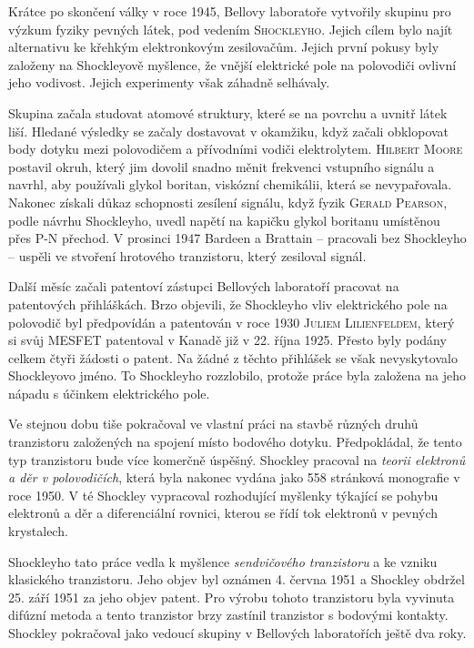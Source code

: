     \begin{mdframed}[style=mdnote]
      
      Krátce po skončení války v roce 1945, Bellovy laboratoře vytvořily skupinu pro výzkum fyziky
      pevných látek, pod vedením \textsc{Shockleyho}. Jejich cílem bylo najít alternativu ke křehkým
      elektronkovým zesilovačům. Jejich první pokusy byly založeny na Shockleyově myšlence, že
      vnější elektrické pole na polovodiči ovlivní jeho vodivost. Jejich experimenty však záhadně
      selhávaly.

      Skupina začala studovat atomové struktury, které se na povrchu a uvnitř látek liší. Hledané
      výsledky se začaly dostavovat v okamžiku, když začali obklopovat body dotyku mezi polovodičem
      a přívodními vodiči elektrolytem. \textsc{Hilbert Moore} postavil okruh, který jim dovolil
      snadno měnit frekvenci vstupního signálu a navrhl, aby používali glykol boritan, viskózní
      chemikálii, která se nevypařovala. Nakonec získali důkaz schopnosti zesílení signálu, když
      fyzik \textsc{Gerald Pearson}, podle návrhu Shockleyho, uvedl napětí na kapičku glykol
      boritanu umístěnou přes \textsc{P-N} přechod. V prosinci 1947 Bardeen a Brattain – pracovali
      bez Shockleyho – uspěli ve stvoření hrotového tranzistoru, který zesiloval signál.

      Další měsíc začali patentoví zástupci Bellových laboratoří pracovat na patentových
      přihláškách. Brzo objevili, že Shockleyho vliv elektrického pole na polovodič byl předpovídán
      a patentován v roce 1930 \textsc{Juliem Lilienfeldem}, který si svůj \textsc{MESFET}
      patentoval v Kanadě již v 22. října 1925. Přesto byly podány celkem čtyři žádosti o patent. Na
      žádné z těchto přihlášek se však nevyskytovalo Shockleyovo jméno. To Shockleyho rozzlobilo,
      protože práce byla založena na jeho nápadu s účinkem elektrického pole. 
      
      Ve stejnou dobu tiše pokračoval ve vlastní práci na stavbě různých druhů tranzistoru
      založených na spojení místo bodového dotyku. Předpokládal, že tento typ tranzistoru bude více
      komerčně úspěšný. Shockley pracoval na \emph{teorii elektronů a děr v polovodičích}, která
      byla nakonec vydána jako 558 stránková monografie v roce 1950. V té Shockley vypracoval
      rozhodující myšlenky týkající se pohybu elektronů a děr a diferenciální rovnici, kterou se
      řídí tok elektronů v pevných krystalech.

      Shockleyho tato práce vedla k myšlence \emph{sendvičového tranzistoru} a ke vzniku klasického
      tranzistoru. Jeho objev byl oznámen 4. června 1951 a Shockley obdržel 25. září 1951 za jeho
      objev patent. Pro výrobu tohoto tranzistoru byla vyvinuta difúzní metoda a tento tranzistor
      brzy zastínil tranzistor s bodovými kontakty. Shockley pokračoval jako vedoucí skupiny v
      Bellových laboratořích ještě dva roky.


\end{mdframed}
